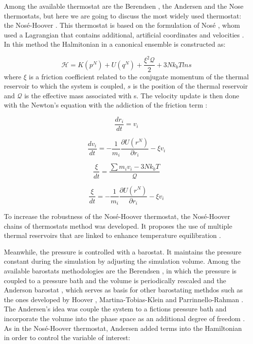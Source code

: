 Among the available thermostat are the Berendsen \cite{doi:10.1063/1.448118}, the Andersen \cite{1980JChPh722384A} and the Nose \cite{1984JChPh81511N} thermostats, but here we are going to discuss the most widely used thermostat: the Nosé-Hoover \cite{PhysRevA.31.1695}. This thermostat is based on the formulation of Nosé \cite{1984JChPh81511N}, whom used a Lagrangian that contains additional, artificial coordinates and velocities \cite{frenkel}. In this method the Halmitonian in a canonical ensemble is constructed as:

\begin{equation}
\mathcal{H} =  K(p^{N}) + U(q^{N})  + \frac{\xi ^{2} \mathcal{Q}}{2} + 3Nk_{b}T ln s
\end{equation}
where $\xi$ is a friction coefficient related to the conjugate momentum of the thermal reservoir to which the system is coupled, $s$ is the position of the thermal reservoir and $\mathcal{Q}$ is the effective mass associated with s. The velocity update is then done with the Newton's equation with the addiction of the friction term \cite{shell2015}:

\begin{equation}
	\frac{dr_{i}}{dt} = v_{i}
\end{equation}

\begin{equation}
\frac{dv_{i}}{dt} = - \frac{1}{m_{i}} \frac{\partial U (r^{N})}{\partial r_{i}} - \xi v_{i}
\end{equation}

\begin{equation}
\frac{\xi}{dt} = \frac{\sum m_{i} v_{i} - 3Nk_{b}T}{\mathcal{Q}} 
\end{equation}

\begin{equation}
\frac{\xi}{dt} = - \frac{1}{m_{i}} \frac{\partial U (r^{N})}{\partial r_{i}} - \xi v_{i}
\end{equation}

To increase the robustness of the Nosé-Hoover thermostat, the Nosé-Hoover chains of thermostats method was developed. It proposes the use of multiple thermal reservoirs that are linked to enhance temperature equilibration \cite{shell2015}.  
 
Meanwhile, the pressure is controlled with a barostat. It maintains the pressure constant during the simulation by adjusting the simulation volume. Among the available  barostats methodologies are the Berendsen \cite{doi:10.1063/1.448118}, in which the pressure is coupled to a pressure bath and the volume is periodically rescaled and the Anderson barostat \cite{1980JChPh722384A}, which serves as basis for other barostating methdos such as the ones developed by Hoover \cite{PhysRevA.31.1695}, Martina-Tobias-Klein \cite{doi:10.1063/1.467468} and Parrinnello-Rahman \cite{doi:10.1063/1.328693}. The Andersen's idea was couple the system to a fictions pressure bath and  incorporate the volume into the phase space as an additional degree of freedom \cite{tuckerman}. As in the Nosé-Hoover thermostat, Andersen added terms into the Hamiltonian in order to control the variable of interest:


